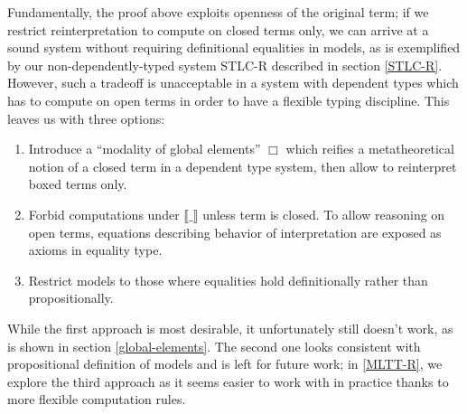 Fundamentally, the proof above exploits openness of the
original term; if we restrict reinterpretation to
compute on closed terms only, we can arrive at a sound
system without requiring definitional equalities in
models, as is exemplified by our non-dependently-typed
system STLC-R described in section \ref{STLC-R}.
However, such a tradeoff is unacceptable in a system
with dependent types which has to compute on open terms
in order to have a flexible typing discipline. This
leaves us with three options:

\begin{enumerate}
    \item Introduce a ``modality of global elements''
        $\Box$ which reifies a metatheoretical notion of
        a closed term in a dependent type system, then
        allow to reinterpret boxed terms only.
    \item Forbid computations under
        $\llbracket\_\rrbracket$ unless term is closed.
        To allow reasoning on open terms, equations
        describing behavior of interpretation are
        exposed as axioms in equality type.
    \item Restrict models to those where equalities hold
        definitionally rather than propositionally.
\end{enumerate}

While the first approach is most desirable, it
unfortunately still doesn't work, as is shown in section
\ref{global-elements}. The second one looks consistent
with propositional definition of models and is left for
future work; in \ref{MLTT-R}, we explore the third
approach as it seems easier to work with in practice
thanks to more flexible computation rules.
